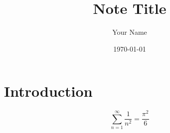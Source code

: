 \documentclass[11pt]{article}
\title{Note Title}
\author{Your Name}
\date{\today}
\begin{document}
\maketitle

\section{Introduction}
\begin{equation}
    \sum_{n=1}^{\infty} \frac{1}{n^2} = \frac{\pi^2}{6}
\end{equation}
\end{document}
